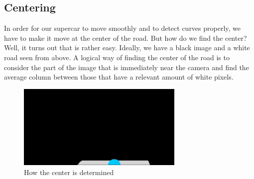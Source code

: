 \documentclass[12pt,a4paper]{article}
\begin{document}
\begin{large}
\begin{figure} [!hbp]
\begin{subfigure}[b]{0.3\textwidth}
    \end{subfigure}
  \end{figure}

\subsection{Centering}
In order for our supercar to move smoothly and to detect curves properly, we have to make it move at the center of the road. But how do we find the center? \\
Well, it turns out that is rather easy. Ideally, we have a black image and a white road seen from above. A logical way of finding the center of the road is to consider the part of the image that is immediately near the camera and find the average column between those that have a relevant amount of white pixels.

\begin{figure} [!htb]
  \centering
  \captionsetup{justification=centering}
  \includegraphics[width=8cm]{images/base.jpg}
  \caption{How the center is determined}
  \end{figure}


\end{large}
\end{document}
